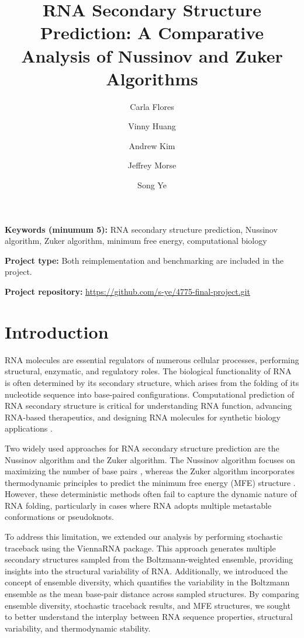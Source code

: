 \documentclass[10pt]{wlscirep}
\title{RNA Secondary Structure Prediction: A Comparative Analysis of Nussinov and Zuker Algorithms}
\author[3]{Carla Flores}
\author[2]{Vinny Huang}
\author[5]{Andrew Kim}
\author[4]{Jeffrey Morse}
\author[1]{Song Ye}
\affil[3]{cmf262@cornell.edu}
\affil[2]{vh222@cornell.edu}
\affil[5]{amk379@cornell.edu}
\affil[4]{jbm249@cornell.edu}
\affil[1]{sy459@cornell.edu}
\begin{document}
\flushbottom
\maketitle

\thispagestyle{empty}

\noindent \textbf{Keywords (minumum 5):} RNA secondary structure prediction, Nussinov algorithm, Zuker algorithm, minimum free energy, computational biology

\noindent \textbf{Project type:}  Both reimplementation and benchmarking
are included in the project.


\noindent \textbf{Project repository:} \url{
    https://github.com/s-ye/4775-final-project.git
}   

\vspace{2em}



\newpage
\setcounter{page}{1}

\section{Introduction}
RNA molecules are essential regulators of numerous cellular processes, performing structural, enzymatic, and regulatory roles. The biological functionality of RNA is often determined by its secondary structure, which arises from the folding of its nucleotide sequence into base-paired configurations. Computational prediction of RNA secondary structure is critical for understanding RNA function, advancing RNA-based therapeutics, and designing RNA molecules for synthetic biology applications \cite{turner1999thermodynamic, hofacker2003viennarna}.

Two widely used approaches for RNA secondary structure prediction are the Nussinov algorithm and the Zuker algorithm. The Nussinov algorithm focuses on maximizing the number of base pairs \cite{nussinov1978loop}, whereas the Zuker algorithm incorporates thermodynamic principles to predict the minimum free energy (MFE) structure \cite{zuker1981optimal}. However, these deterministic methods often fail to capture the dynamic nature of RNA folding, particularly in cases where RNA adopts multiple metastable conformations or pseudoknots.

To address this limitation, we extended our analysis by performing stochastic traceback using the ViennaRNA package. This approach generates multiple secondary structures sampled from the Boltzmann-weighted ensemble, providing insights into the structural variability of RNA. Additionally, we introduced the concept of ensemble diversity, which quantifies the variability in the Boltzmann ensemble as the mean base-pair distance across sampled structures. By comparing ensemble diversity, stochastic traceback results, and MFE structures, we sought to better understand the interplay between RNA sequence properties, structural variability, and thermodynamic stability.
\end{document}
